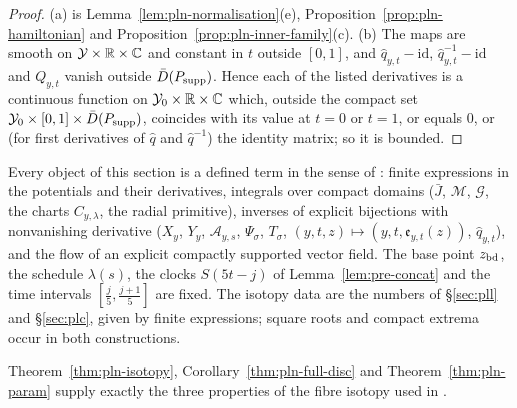 \begin{proof}
(a) is Lemma~\ref{lem:pln-normalisation}(e), Proposition~\ref{prop:pln-hamiltonian} and
Proposition~\ref{prop:pln-inner-family}(c). (b) The maps are smooth on $\mathcal Y\times\mathbb{R}\times\mathbb{C}$ and constant in $t$ outside
$[0,1]$, and $\hat q_{y,t}-\mathrm{id}$, $\hat q^{-1}_{y,t}-\mathrm{id}$ and $Q_{y,t}$ vanish outside $\bar D(P_{\rm supp})$. Hence each of
the listed derivatives is a continuous function on $\mathcal Y_0\times\mathbb{R}\times\mathbb{C}$ which, outside the compact set
$\mathcal Y_0\times[0,1]\times\bar D(P_{\rm supp})$, coincides with its value at $t=0$ or $t=1$, or equals $0$, or (for first
derivatives of $\hat q$ and $\hat q^{-1}$) the identity matrix; so it is bounded.
\end{proof}

\begin{remark}[Explicitness]\label{rem:pln-explicit}
Every object of this section is a defined term in the sense of : finite expressions in the
potentials and their derivatives, integrals over compact domains ($\bar J$, $\mathcal M$, $\mathcal G$, the charts
$C_{y,\lambda}$, the radial primitive), inverses of explicit bijections with nonvanishing derivative ($X_y$, $Y_y$,
$\mathcal A_{y,s}$, $\Psi_\sigma$, $T_\sigma$, $(y,t,z)\mapsto(y,t,\mathfrak e_{y,t}(z))$, $\hat q_{y,t}$), and the flow of an explicit compactly supported vector field. The base point
$z_{\rm bd}$, the schedule $\lambda(s)$, the clocks $S(5t-j)$ of Lemma~\ref{lem:pre-concat} and the time intervals
$[\frac j5,\frac{j+1}5]$ are fixed. The isotopy data are the numbers of \S\ref{sec:pll} and \S\ref{sec:plc}, given by finite expressions; square roots and compact extrema occur in both constructions.
\end{remark}

Theorem~\ref{thm:pln-isotopy}, Corollary~\ref{thm:pln-full-disc} and Theorem~\ref{thm:pln-param} supply exactly the three
properties of the fibre isotopy used in .
